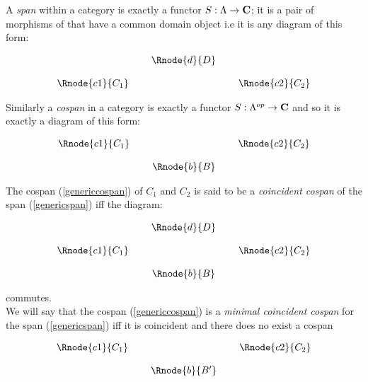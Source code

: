 \documentclass[10pt,a4paper]{article}
\begin{document}
\noindent
A \textit{span} within a category  is exactly a functor 
$S: \Lambda \rightarrow \textbf{C}$; it is a pair of morphisms of  that have a common domain object i.e it is any diagram of this form:

\begin{center}
\begin{equation}
\label{genericspan}
\begin{array}{cp{0.1cm}cp{0.1cm} c}
            & &\Rnode{d}{D}                  \\ [0.4cm]
\Rnode{c1}{C_1}& &                & & \Rnode{c2}{C_2} 
\end{array}
\end{equation}
\end{center}

\noindent Similarly a \textit{cospan} in a category  is exactly a functor $S: \Lambda^{op} \rightarrow \textbf{C}$ and so it is exactly a diagram of this form:
\begin{center}
\begin{equation}
\label{genericcospan}
\begin{array}{cp{0.1cm}cp{0.1cm} c}
\Rnode{c1}{C_1}& &                & & \Rnode{c2}{C_2} \\ [0.4cm]
            & &\Rnode{b}{B}
\end{array}
\end{equation}
\end{center}

\noindent
The cospan (\ref{genericcospan}) of $C_1$ and $C_2$ is said to be a 
\textit{coincident cospan} of the span (\ref{genericspan}) iff the 
diagram:
\begin{center}
\begin{equation}
\begin{array}{cp{0.1cm}cp{0.1cm} c}
            & &\Rnode{d}{D}                           \\ [0.4cm]
\Rnode{c1}{C_1}& &                & & \Rnode{c2}{C_2} \\ [0.4cm]
            & &\Rnode{b}{B}
\end{array}
\end{equation}
\end{center}

\noindent commutes. \\

\noindent We will say that the cospan (\ref{genericcospan}) is a 
\textit{minimal coincident cospan} for the span (\ref{genericspan}) iff it is 
coincident  and there does no exist a cospan 
\begin{center}
\begin{equation}
\begin{array}{cp{0.1cm}cp{0.1cm} c}
\Rnode{c1}{C_1}& &                & & \Rnode{c2}{C_2} \\ [0.4cm]
            & &\Rnode{b}{B'}
\end{array}
\end{equation}
\end{center}
\end{document}
